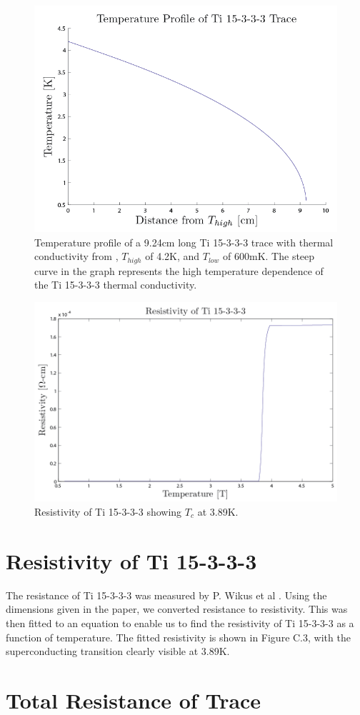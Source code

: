 \documentclass{report}
\begin{document}
\begin{appendices}
\begin{figure}[h]
\centering
\includegraphics[width = .6\textwidth]{Ti153_T_Profile.png}
\caption{Temperature profile of a 9.24cm long Ti 15-3-3-3 trace with thermal conductivity from \cite{wik}, $T_{high}$ of 4.2K, and $T_{low}$ of 600mK. The steep curve in the graph represents the high temperature dependence of the Ti 15-3-3-3 thermal conductivity. }
\end{figure}
\begin{figure}[h]
\centering
\includegraphics[width = .6\textwidth]{Ti_Resistivity.png}
\caption{Resistivity of Ti 15-3-3-3 showing $T_c$ at 3.89K.}
\end{figure}

\section{Resistivity of Ti 15-3-3-3}
The resistance of Ti 15-3-3-3 was measured by P. Wikus et al \cite{wik}. Using the dimensions given in the paper, we converted resistance to resistivity. This was then fitted to an equation to enable us to find the resistivity of Ti 15-3-3-3 as a function of temperature. The fitted resistivity is shown in Figure C.3, with the superconducting transition clearly visible at 3.89K.

\section{Total Resistance of Trace}


\end{appendices}
\end{document}

